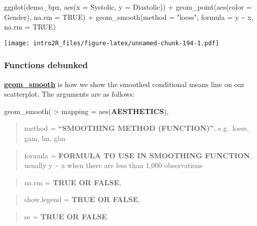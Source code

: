 \documentclass[
]{book}
\newenvironment{Shaded}{\begin{snugshade}}{\end{snugshade}}
\newcommand{\AttributeTok}[1]{\textcolor[rgb]{0.77,0.63,0.00}{#1}}
\newcommand{\ConstantTok}[1]{\textcolor[rgb]{0.00,0.00,0.00}{#1}}
\newcommand{\FunctionTok}[1]{\textcolor[rgb]{0.00,0.00,0.00}{#1}}
\newcommand{\NormalTok}[1]{#1}
\newcommand{\SpecialCharTok}[1]{\textcolor[rgb]{0.00,0.00,0.00}{#1}}
\newcommand{\StringTok}[1]{\textcolor[rgb]{0.31,0.60,0.02}{#1}}
\begin{document}
\begin{Shaded}
\begin{Highlighting}[]
\FunctionTok{ggplot}\NormalTok{(demo\_bpx, }\FunctionTok{aes}\NormalTok{(}\AttributeTok{x =}\NormalTok{ Systolic, }\AttributeTok{y =}\NormalTok{ Diastolic)) }\SpecialCharTok{+} 
    \FunctionTok{geom\_point}\NormalTok{(}\FunctionTok{aes}\NormalTok{(}\AttributeTok{color =}\NormalTok{ Gender), }
               \AttributeTok{na.rm =} \ConstantTok{TRUE}\NormalTok{) }\SpecialCharTok{+} 
    \FunctionTok{geom\_smooth}\NormalTok{(}\AttributeTok{method =} \StringTok{"loess"}\NormalTok{,}
                \AttributeTok{formula =}\NormalTok{ y }\SpecialCharTok{\textasciitilde{}}\NormalTok{ x,}
                \AttributeTok{na.rm =} \ConstantTok{TRUE}\NormalTok{)}
\end{Highlighting}
\end{Shaded}

\texttt{[image: intro2R\_files/figure-latex/unnamed-chunk-194-1.pdf]}

\hypertarget{functions-debunked-19}{%
\subsubsection{Functions debunked}\label{functions-debunked-19}}

\href{https://ggplot2.tidyverse.org/reference/ggplot.html}{\textbf{geom\_smooth}} is how we show the smoothed conditional means line on our scatterplot. The arguments are as follows:

geom\_smooth(
\textgreater{} mapping = aes(\textbf{AESTHETICS}),

\begin{quote}
method = \textbf{``SMOOTHING METHOD (FUNCTION)''}, e.g.~loess, gam, lm, glm
\end{quote}

\begin{quote}
formula = \textbf{FORMULA TO USE IN SMOOTHING FUNCTION}, usually y \textasciitilde{} x when there are less than 1,000 observations
\end{quote}

\begin{quote}
na.rm = \textbf{TRUE OR FALSE},
\end{quote}

\begin{quote}
show.legend = \textbf{TRUE OR FALSE},
\end{quote}

\begin{quote}
se = \textbf{TRUE OR FALSE}
\end{quote}
\end{document}
